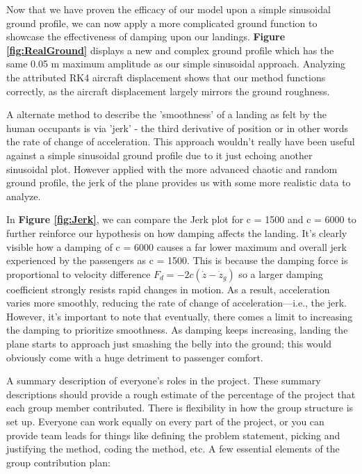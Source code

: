 \documentclass[12pt,letterpaper, onecolumn]{exam}
\begin{document}
\begin{questions}
\begin{solution}
            Now that we have proven the efficacy of our model upon a simple sinusoidal ground profile, we can now apply a more complicated ground function to showcase the effectiveness of damping upon our landings. \textbf{Figure \ref{fig:RealGround}} displays a new and complex ground profile which has the same 0.05 m maximum amplitude as our simple sinusoidal approach. Analyzing the attributed RK4 aircraft displacement shows that our method functions correctly, as the aircraft displacement largely mirrors the ground roughness.

            A alternate method to describe the ’smoothness’ of a landing as felt by the human occupants is via ’jerk’ - the third derivative of position or in other words the rate of change of acceleration. This approach wouldn't really have been useful against a simple sinusoidal ground profile due to it just echoing another sinusoidal plot. However applied with the more advanced chaotic and random ground profile, the jerk of the plane provides us with some more realistic data to analyze.
            
            In \textbf{Figure \ref{fig:Jerk}}, we can compare the Jerk plot for c = 1500 and c = 6000 to further reinforce our hypothesis on how damping affects the landing. It's clearly visible how a damping of c = 6000 causes a far lower maximum and overall jerk experienced by the passengers as c = 1500. This is because the damping force is proportional to velocity difference $F_d=-2c(\dot{z}-\dot{z}_g)$ so a larger damping coefficient strongly resists rapid changes in motion. As a result, acceleration varies more smoothly, reducing the rate of change of acceleration—i.e., the jerk. However, it's important to note that eventually, there comes a limit to increasing the damping to prioritize smoothness. As damping keeps increasing, landing the plane starts to approach just smashing the belly into the ground; this would obviously come with a huge detriment to passenger comfort. 

        \end{solution}

\question[6 Points] A summary description of everyone’s roles in the project. These summary descriptions should provide a rough estimate of the percentage of the project that each group member contributed. There is flexibility in how the group structure is set up. Everyone can work equally on every part of the project, or you can provide team leads for things like defining the problem statement, picking and justifying the method, coding the method, etc. A few essential elements of the group contribution plan: \droppoints


\end{questions}
\end{document}
